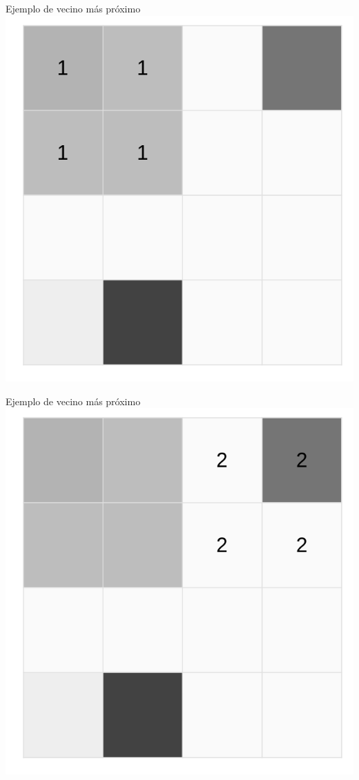 \documentclass[
  11pt,
  ignorenonframetext,
]{beamer}
\begin{document}
\begin{frame}{Ejemplo de vecino más próximo}
\protect\hypertarget{ejemplo-de-vecino-muxe1s-pruxf3ximo-1}{}
\includegraphics{Interpolacion/Ejemplo-vecino-1.png}
\end{frame}

\begin{frame}{Ejemplo de vecino más próximo}
\protect\hypertarget{ejemplo-de-vecino-muxe1s-pruxf3ximo-2}{}
\includegraphics{Interpolacion/Ejemplo-vecino-2.png}
\end{frame}
\end{document}
